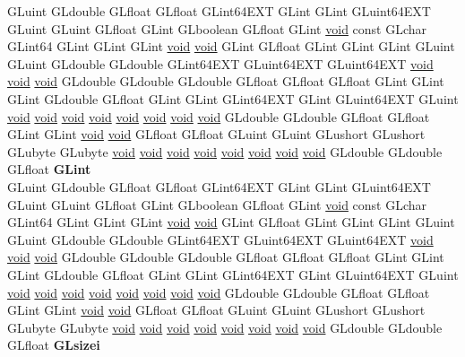 \begin{DoxyCompactItemize}
\begin{tabbing}
\>GLuint GLdouble GLfloat GLfloat GLint64EXT GLint GLint GLuint64EXT GLuint GLuint GLfloat GLint GLboolean GLfloat GLint \hyperlink{interfacevoid}{void} const GLchar GLint64 GLint GLint GLint \hyperlink{interfacevoid}{void} \hyperlink{interfacevoid}{void} GLint GLfloat GLint GLint GLint GLuint GLuint GLdouble GLdouble GLint64EXT GLuint64EXT GLuint64EXT \hyperlink{interfacevoid}{void} \hyperlink{interfacevoid}{void} \hyperlink{interfacevoid}{void} GLdouble GLdouble GLdouble GLfloat GLfloat GLfloat GLint GLint GLint GLdouble GLfloat GLint GLint GLint64EXT GLint GLuint64EXT GLuint \hyperlink{interfacevoid}{void} \hyperlink{interfacevoid}{void} \hyperlink{interfacevoid}{void} \hyperlink{interfacevoid}{void} \hyperlink{interfacevoid}{void} \hyperlink{interfacevoid}{void} \hyperlink{interfacevoid}{void} \hyperlink{interfacevoid}{void} GLdouble GLdouble GLfloat GLfloat GLint GLint \hyperlink{interfacevoid}{void} \hyperlink{interfacevoid}{void} GLfloat GLfloat GLuint GLuint GLushort GLushort GLubyte GLubyte \hyperlink{interfacevoid}{void} \hyperlink{interfacevoid}{void} \hyperlink{interfacevoid}{void} \hyperlink{interfacevoid}{void} \hyperlink{interfacevoid}{void} \hyperlink{interfacevoid}{void} \hyperlink{interfacevoid}{void} \hyperlink{interfacevoid}{void} GLdouble GLdouble GLfloat {\bfseries GLint}\\
\>GLuint GLdouble GLfloat GLfloat GLint64EXT GLint GLint GLuint64EXT GLuint GLuint GLfloat GLint GLboolean GLfloat GLint \hyperlink{interfacevoid}{void} const GLchar GLint64 GLint GLint GLint \hyperlink{interfacevoid}{void} \hyperlink{interfacevoid}{void} GLint GLfloat GLint GLint GLint GLuint GLuint GLdouble GLdouble GLint64EXT GLuint64EXT GLuint64EXT \hyperlink{interfacevoid}{void} \hyperlink{interfacevoid}{void} \hyperlink{interfacevoid}{void} GLdouble GLdouble GLdouble GLfloat GLfloat GLfloat GLint GLint GLint GLdouble GLfloat GLint GLint GLint64EXT GLint GLuint64EXT GLuint \hyperlink{interfacevoid}{void} \hyperlink{interfacevoid}{void} \hyperlink{interfacevoid}{void} \hyperlink{interfacevoid}{void} \hyperlink{interfacevoid}{void} \hyperlink{interfacevoid}{void} \hyperlink{interfacevoid}{void} \hyperlink{interfacevoid}{void} GLdouble GLdouble GLfloat GLfloat GLint GLint \hyperlink{interfacevoid}{void} \hyperlink{interfacevoid}{void} GLfloat GLfloat GLuint GLuint GLushort GLushort GLubyte GLubyte \hyperlink{interfacevoid}{void} \hyperlink{interfacevoid}{void} \hyperlink{interfacevoid}{void} \hyperlink{interfacevoid}{void} \hyperlink{interfacevoid}{void} \hyperlink{interfacevoid}{void} \hyperlink{interfacevoid}{void} \hyperlink{interfacevoid}{void} GLdouble GLdouble GLfloat {\bfseries GLsizei}\\

\end{tabbing}
\end{DoxyCompactItemize}
